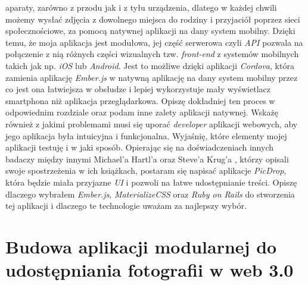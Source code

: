 \documentclass[openright]{xmgr}
\begin{document}
aparaty, zarówno z przodu jak i z tyłu urządzenia, dlatego w każdej chwili możemy wysłać zdjęcia z dowolnego miejsca do rodziny i przyjaciół poprzez sieci społecznościowe, za pomocą natywnej aplikacji na dany system mobilny. Dzięki temu, że moja aplikacja jest modułowa, jej część serwerowa czyli \textit{API} pozwala na połączenie z nią różnych części wizualnych tzw. \textit{front-end} z systemów mobilnych takich jak np. \textit{iOS} lub \textit{Android}. Jest to możliwe dzięki aplikacji \textit{Cordova}, która zamienia aplikację \textit{Ember.js} w natywną aplikację na dany system mobilny przez co jest ona łatwiejsza w obsłudze i lepiej wykorzystuje mały wyświetlacz smartphona niż aplikacja przeglądarkowa. Opiszę dokładniej ten proces w odpowiednim rozdziale oraz podam inne zalety aplikacji natywnej. Wskażę również z jakimi problemami musi się uporać \textit{developer} aplikacji webowych, aby jego aplikacja była intuicyjna i funkcjonalna. Wyjaśnię, które elementy mojej aplikacji testuję i w jaki sposób. Opierając się na  doświadczeniach innych badaczy  między innymi Michael'a Hartl'a \cite{RailsTutorialBook} oraz Steve'a Krug'a  \cite {StiveKrug}, którzy opisali swoje spostrzeżenia w ich książkach, postaram się napisać aplikacje \textit{PicDrop}, która  będzie miała przyjazne \textit{UI} i pozwoli na łatwe udostępnianie treści. Opiszę dlaczego wybrałem \textit{Ember.js}, \textit{MaterializeCSS} oraz \textit{Ruby on Rails} do stworzenia tej aplikacji i dlaczego te technologie uważam za najlepszy wybór.


\chapter{Budowa aplikacji modularnej do udostępniania fotografii  w web 3.0}
\end{document}
